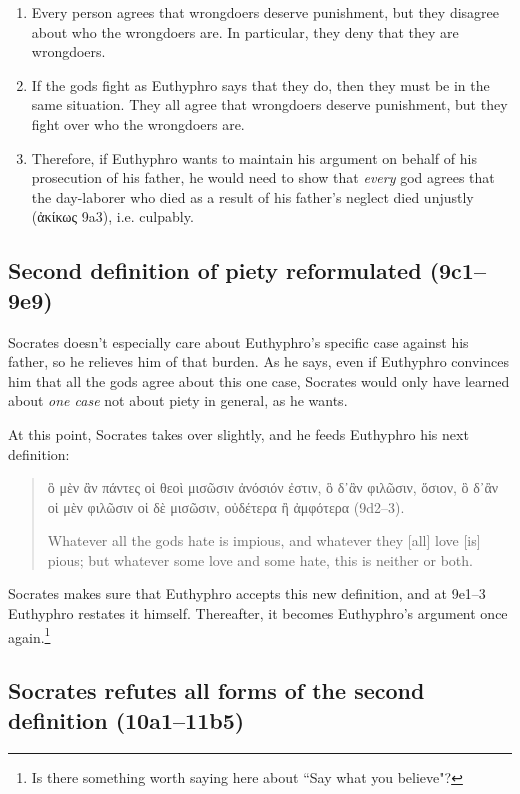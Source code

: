 \documentclass[11pt]{article}
\begin{document}
\begin{enumerate}
    \item Every person agrees that wrongdoers deserve punishment, but they disagree about who the wrongdoers are.  In particular, they deny that they are wrongdoers.
    \item If the gods fight as Euthyphro says that they do, then they must be in the same situation.  They all agree that wrongdoers deserve punishment, but they fight over who the wrongdoers are.
    \item Therefore, if Euthyphro wants to maintain his argument on behalf of his prosecution of his father, he would need to show that \emph{every} god agrees that the day-laborer who died as a result of his father's neglect died unjustly (ἀκίκως 9a3), i.e. culpably.
\end{enumerate}

\subsection{Second definition of piety reformulated (9c1--9e9)}

Socrates doesn't especially care about Euthyphro's specific case against his father, so he relieves him of that burden.  As he says, even if Euthyphro convinces him that all the gods agree about this one case, Socrates would only have learned about \emph{one case} not about piety in general, as he wants.

At this point, Socrates takes over slightly, and he feeds Euthyphro his next definition:

\begin{quote}
    ὃ μὲν ἂν πάντες οἱ θεοὶ μισῶσιν ἀνόσιόν ἐστιν, ὃ δ᾽ἂν φιλῶσιν, ὅσιον, ὃ δ᾽ἂν οἱ μὲν φιλῶσιν οἱ δὲ μισῶσιν, οὐδέτερα ἢ ἀμφότερα (9d2--3).

    Whatever all the gods hate is impious, and whatever they [all] love [is] pious; but whatever some love and some hate, this is neither or both.
\end{quote}

Socrates makes sure that Euthyphro accepts this new definition, and at 9e1--3 Euthyphro restates it himself.  Thereafter, it becomes Euthyphro's argument once again.\footnote{Is there something worth saying here about ``Say what you believe"?}

\subsection{Socrates refutes all forms of the second definition (10a1--11b5)}
\end{document}
